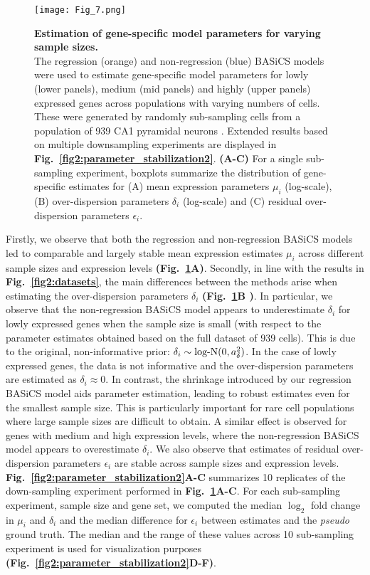 \begin{figure}[!h]
\centering
\texttt{[image: Fig\_7.png]}
\caption[Estimation of gene-specific model parameters for varying sample sizes]{\textbf{Estimation of gene-specific model parameters for varying sample sizes.}\\
The regression (orange) and non-regression (blue) BASiCS models were used to estimate gene-specific model parameters for lowly (lower panels), medium (mid panels) and highly (upper panels) expressed genes across populations with varying numbers of cells. These were generated by randomly sub-sampling cells from a population of 939 CA1 pyramidal neurons \citep{Zeisel2015}. Extended results based on multiple downsampling experiments are displayed in \textbf{Fig.~\ref{fig2:parameter_stabilization2}}. \textbf{(A-C)} For a single sub-sampling experiment, boxplots summarize the distribution of gene-specific estimates for (A) mean expression parameters $\mu_i$ (log-scale), (B) over-dispersion parameters $\delta_i$ (log-scale) and (C) residual over-dispersion parameters $\epsilon_i$.}
\label{fig2:parameter_stabilization}
\end{figure}

Firstly, we observe that both the regression and non-regression BASiCS models led to comparable and largely stable mean expression estimates $\mu_i$ across different sample sizes and expression levels \textbf{(Fig.~\ref{fig2:parameter_stabilization}A)}. Secondly, in line with the results in \textbf{Fig.~\ref{fig2:datasets}}, the main differences between the methods arise when estimating the over-dispersion parameters $\delta_i$ \textbf{(Fig.~\ref{fig2:parameter_stabilization}B )}. In particular, we observe that the non-regression BASiCS model appears to underestimate $\delta_i$ for lowly expressed genes when the sample size is small (with respect to the parameter estimates obtained based on the full dataset of 939 cells). This is due to the original, non-informative prior: $\delta_i\sim\textnormal{log-N}(0,a_\delta^2)$. In the case of lowly expressed genes, the data is not informative and the over-dispersion parameters are estimated as $\delta_i\approx{}0$. In contrast, the shrinkage introduced by our regression BASiCS model aids parameter estimation, leading to robust estimates even for the smallest sample size. This is particularly important for rare cell populations where large sample sizes are difficult to obtain. A similar effect is observed for genes with medium and high expression levels, where the non-regression BASiCS model appears to overestimate $\delta_i$. We also observe that estimates of residual over-dispersion parameters $\epsilon_i$ are stable across sample sizes and expression levels. \textbf{Fig.~\ref{fig2:parameter_stabilization2}A-C} summarizes 10 replicates of the down-sampling experiment performed in \textbf{Fig.~\ref{fig2:parameter_stabilization}A-C}. For each sub-sampling experiment, sample size and gene set, we computed the median $\log_2$ fold change in $\mu_i$ and $\delta_i$ and the median difference for $\epsilon_i$ between estimates and the \emph{pseudo} ground truth. The median and the range of these values across 10 sub-sampling experiment is used for visualization purposes \textbf{(Fig.~\ref{fig2:parameter_stabilization2}D-F)}. 


